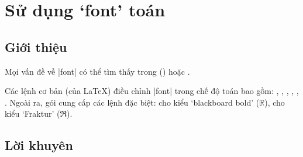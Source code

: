 \chapter{Sử dụng `font' toán}

\section{Giới thiệu}

Mọi vấn đề về |font| có thể tìm thấy trong ()
hoặc  \cite{tlc}.

\medskip
Các lệnh cơ bản (của \LaTeX{})
điều chỉnh |font| trong chế độ toán bao gồm:
, , , , , .
Ngoài ra, gói  cung cấp các lệnh đặc biệt:
 cho kiểu `blackboard bold' ($\mathbb R$),
 cho kiểu `Fraktur' ($\mathfrak R$).

\section{Lời khuyên}

